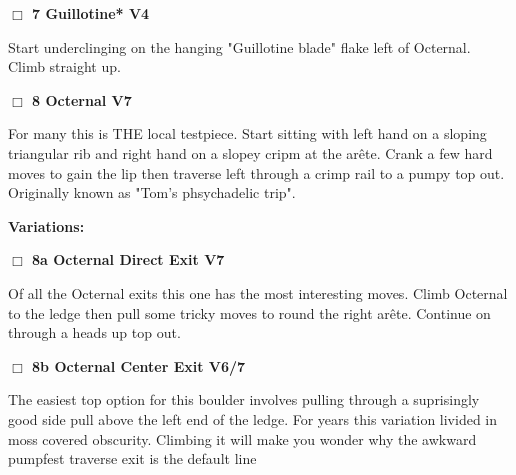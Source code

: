 \begin{multicols}{2}
\begin{adjustwidth}{0.5cm}{}
\end{adjustwidth}


\needspace{1.5cm}
\label{rt:Guillotine}
\colorbox{RoyalBlue!20}{
\parbox{0.95\linewidth}{
\hspace{-1ex}\textbf{$\Box$
7 Guillotine* V4  
}}}
\begin{adjustwidth}{1.3em}{}			
Start underclinging on the hanging "Guillotine blade" flake left of Octernal. Climb straight up.
\end{adjustwidth}




\needspace{1.5cm}
\label{rt:Octernal}
\colorbox{Goldenrod!20}{
\parbox{0.95\linewidth}{
\hspace{-1ex}\textbf{$\Box$
8 Octernal V7  
}}}
\begin{adjustwidth}{1.3em}{}			
For many this is THE local testpiece. Start sitting with left hand on a sloping triangular rib and right hand on a slopey cripm at the arête. Crank a few hard moves to gain the lip then traverse left through a crimp rail to a pumpy top out. Originally known as "Tom's phsychadelic trip".
\end{adjustwidth}


\begin{adjustwidth}{0.5cm}{}				
\needspace{3cm}
\textbf{Variations:} \newline

\needspace{1.5cm}
\label{vr:Octernal Direct Exit}
\colorbox{Goldenrod!20}{
\parbox{0.95\linewidth}{
\hspace{-1ex}\textbf{$\Box$
8a Octernal Direct Exit V7  
}}}
\begin{adjustwidth}{1.3em}{}			
Of all the Octernal exits this one has the most interesting moves. Climb Octernal to the ledge then pull some tricky moves to round the right arête. Continue on through a heads up top out.
\end{adjustwidth}




\needspace{1.5cm}
\label{vr:Octernal Center Exit}
\colorbox{Goldenrod!20}{
\parbox{0.95\linewidth}{
\hspace{-1ex}\textbf{$\Box$
8b Octernal Center Exit V6/7  
}}}
\begin{adjustwidth}{1.3em}{}			
The easiest top option for this boulder involves pulling through a suprisingly good side pull above the left end of the ledge. For years this variation livided in moss covered obscurity. Climbing it will make you wonder why the awkward pumpfest traverse exit is the default line
\end{adjustwidth}





\end{adjustwidth}
\end{multicols}
